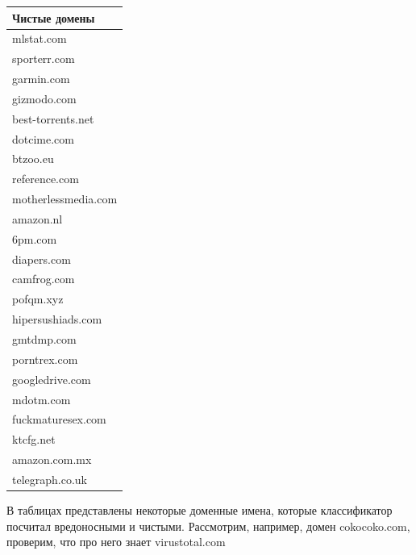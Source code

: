 \documentclass[14pt]{extreport} %
\begin{document}
\begin{center}
\begin{tabular}{ | l |}
	\end{tabular}
	\begin{tabular}{|l|}
		\hline                    
		Чистые домены \\ \hline
		mlstat.com                \\ \hline 
		sporterr.com              \\ \hline 
		garmin.com                \\ \hline 
		gizmodo.com               \\ \hline 
		best-torrents.net         \\ \hline 
		dotcime.com               \\ \hline 
		btzoo.eu                  \\ \hline 
		reference.com             \\ \hline 
		motherlessmedia.com       \\ \hline 
		amazon.nl                 \\ \hline 
		6pm.com                   \\ \hline 
		diapers.com               \\ \hline 
		camfrog.com               \\ \hline 
		pofqm.xyz                 \\ \hline 
		hipersushiads.com         \\ \hline 
		gmtdmp.com                \\ \hline 
		porntrex.com              \\ \hline 
		googledrive.com           \\ \hline 
		mdotm.com                 \\ \hline 
		fuckmaturesex.com         \\ \hline 
		ktcfg.net                 \\ \hline 
		amazon.com.mx             \\ \hline 
		telegraph.co.uk           \\ \hline 
	\end{tabular}
	    
\end{center}
В таблицах представлены некоторые доменные имена, которые классификатор посчитал вредоносными и чистыми.
Рассмотрим, например, домен cokocoko.com, проверим, что про него знает virustotal.com
\end{document}
